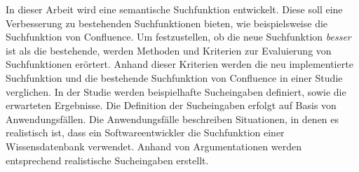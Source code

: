 In dieser Arbeit wird eine semantische Suchfunktion entwickelt.
Diese soll eine Verbesserung zu bestehenden Suchfunktionen bieten, wie beispielsweise die Suchfunktion von Confluence.
Um festzustellen, ob die neue Suchfunktion \textit{besser} ist als die bestehende, werden Methoden und Kriterien zur Evaluierung von Suchfunktionen erörtert.
Anhand dieser Kriterien werden die neu implementierte Suchfunktion und die bestehende Suchfunktion von Confluence in einer Studie verglichen.
In der Studie werden beispielhafte Sucheingaben definiert, sowie die erwarteten Ergebnisse.
Die Definition der Sucheingaben erfolgt auf Basis von Anwendungsfällen.
Die Anwendungsfälle beschreiben Situationen, in denen es realistisch ist, dass ein Softwareentwickler die Suchfunktion einer Wissensdatenbank verwendet.
Anhand von Argumentationen werden entsprechend realistische Sucheingaben erstellt.\\

